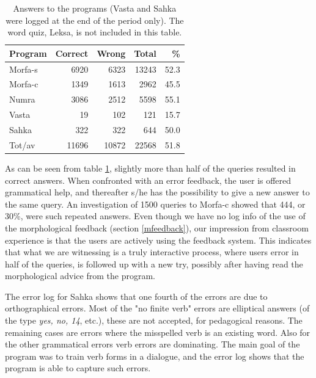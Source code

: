 \documentclass[11pt]{article}
\begin{document}
\begin{table}[htdp]
\caption{Answers to the programs (Vasta and Sahka were logged at the end of the period only). The word quiz, Leksa, is not included in this table.}
\begin{center}
\begin{tabular}{|l|r|r|r|r|}
\hline
Program     & Correct &   Wrong &    Total &  \% \\
\hline									 
Morfa-s  &  6920   & 6323    & 13243    & 52.3 \\
Morfa-c  &  1349   & 1613    & 2962	    & 45.5  \\
Numra    &  3086   & 2512    & 5598	    & 55.1  \\
Vasta    &   19    &   102   &  121	    & 15.7 \\
Sahka    &   322   &   322   &  644	    & 50.0  \\
\hline
Tot/av   & 11696  & 10872  & 22568  & 51.8 \\
\hline
\end{tabular}
\end{center}
\label{log}
\end{table}%

As can be seen from table \ref{log}, slightly more than half of the queries resulted in correct answers. When confronted with an error feedback, the user is offered grammatical help, and thereafter s/he has the possibility to give a new answer to the same query. An investigation of 1500 queries to Morfa-c showed that 444, or 30\%, were such repeated answers. Even though we have no log info of the use of the morphological feedback (section \ref{mfeedback}), our impression from classroom experience is that the users are actively using the feedback system. This indicates that what we are witnessing is a truly interactive process, where users error in half of the queries, is followed up with a new try, possibly after having read the morphological advice from the program.

The error log for Sahka shows that one fourth of the errors are due to orthographical errors. Most of the "no finite verb" errors are elliptical answers (of the type \textit{yes, no, 14}, etc.), these are not accepted, for pedagogical reasons. The remaining cases are errors where the misspelled verb is an existing word. Also for the other grammatical errors verb errors are dominating. The main goal of the program was to train verb forms in a dialogue, and the error log shows that the program is able to capture such errors.
\end{document}
